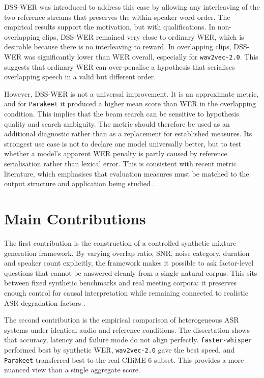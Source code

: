 DSS-WER was introduced to address this case by allowing any interleaving of the two reference streams that preserves the within-speaker word order. The empirical results support the motivation, but with qualifications. In non-overlapping clips, DSS-WER remained very close to ordinary WER, which is desirable because there is no interleaving to reward. In overlapping clips, DSS-WER was significantly lower than WER overall, especially for \texttt{wav2vec-2.0}. This suggests that ordinary WER can over-penalise a hypothesis that serialises overlapping speech in a valid but different order.

However, DSS-WER is not a universal improvement. It is an approximate metric, and for \texttt{Parakeet} it produced a higher mean score than WER in the overlapping condition. This implies that the beam search can be sensitive to hypothesis quality and search ambiguity. The metric should therefore be used as an additional diagnostic rather than as a replacement for established measures. Its strongest use case is not to declare one model universally better, but to test whether a model's apparent WER penalty is partly caused by reference serialisation rather than lexical error. This is consistent with recent metric literature, which emphasises that evaluation measures must be matched to the output structure and application being studied \citep{von_Neumann_2023, vonneumann2024meetevaltoolkitcomputationword, von_Neumann_2025}.

\section{Main Contributions}
The first contribution is the construction of a controlled synthetic mixture generation framework. By varying overlap ratio, SNR, noise category, duration and speaker count explicitly, the framework makes it possible to ask factor-level questions that cannot be answered cleanly from a single natural corpus. This sits between fixed synthetic benchmarks and real meeting corpora: it preserves enough control for causal interpretation while remaining connected to realistic ASR degradation factors \citep{chen2020continuousspeechseparationdataset, cosentino2020librimixopensourcedatasetgeneralizable, yang2022simulatingrealisticspeechoverlaps}.

The second contribution is the empirical comparison of heterogeneous ASR systems under identical audio and reference conditions. The dissertation shows that accuracy, latency and failure mode do not align perfectly. \texttt{faster-whisper} performed best by synthetic WER, \texttt{wav2vec-2.0} gave the best speed, and \texttt{Parakeet} transferred best to the real CHiME-6 subset. This provides a more nuanced view than a single aggregate score.

